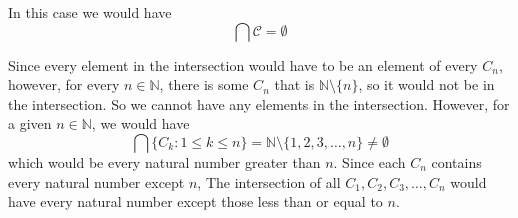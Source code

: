 \documentclass[11pt]{article}
\newcommand{\N}{\mathbb{N}}
\begin{document}
In this case we would have
\[\bigcap\mathcal{C} = \emptyset\]

Since every element in the intersection would have to be an element of every $C_n$, however, for every $n\in\N$, there is some $C_n$ that is $\N\setminus \{n\}$, so it would not be in the intersection. So we cannot have any elements in the intersection. However, for a given $n\in\N$, we would have
\[\bigcap \{C_k: 1 \leq k \leq n\} = \N\setminus\{1,2,3,\dots,n\} \ne \emptyset\]
which would be every natural number greater than $n$. Since each $C_n$ contains every natural number except $n$, The intersection of all $C_1, C_2, C_3,\dots,C_n$ would have every natural number except those less than or equal to $n$.
\end{document}

